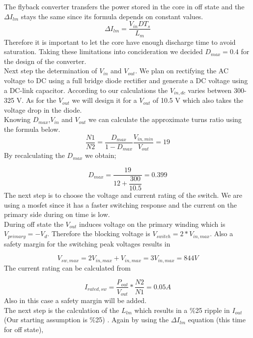 \documentclass[12pt]{article}
\begin{document}
The flyback converter transfers the power stored in the core in off state and the $\Delta I_{lm}$ stays the same since its formula depends on constant values.
\begin{equation*}
    \Delta I_{lm}= \dfrac{V_{in}DT_{s}}{L_{m}}
\end{equation*}
Therefore it is important to let the core have enough discharge time to avoid saturation. Taking these limitations into concideration we decided $D_{max}=0.4$ for the design of the converter.\\
Next step the determination of $V_{in}$ and $V_{out}$. We plan on rectifying the AC voltage to DC using a full bridge diode rectifier and generate a DC voltage using a DC-link capacitor. According to our calculations the $V_{in,dc}$ varies between 300-325 V. As for the $V_{out}$ we will design it for a $V_{out}$ of 10.5 V which also takes the voltage drop in the diode.\\
Knowing $D_{max}$,$V_{in}$ and $V_{out}$ we can calculate the approximate turns ratio using the formula below.
\begin{equation*}
    \dfrac{N1}{N2}=\dfrac{D_{max}}{1-D_{max}}\dfrac{V_{in,min}}{V_{out}}= 19 
\end{equation*}
By recalculating the $D_{max}$ we obtain;

\begin{equation*}
    D_{max}=\dfrac{19}{12+\dfrac{300}{10.5}}=0.399 
\end{equation*}
The next step is to choose the voltage and current rating of the switch. We are using a mosfet since it has a faster switching response and the current on the primary side during on time is low.\\
During off state the $V_{out}$ induces voltage on the primary winding which is $V_{primary}=-V_{d}$.
Therefore the blocking voltage is $V_{switch}=2*V_{in,max}$.
Also a safety margin for the switching peak voltages results in

\begin{equation*}
    V_{sw,max}=2 V_{in,max}+ V_{in,max}=3V_{in,max}=844 V
\end{equation*}
The current rating can be calculated from

\begin{equation*}
    I_{rated,sw}=\dfrac{P_{out}}{V_{out}}*\dfrac{N2}{N1}=0.05A
\end{equation*}
Also in this case a safety margin will be added.\\
The next step is the calculation of the $L_{lm}$ which results in a \%25 ripple in $I_{out}$(Our starting assumption is \%25) 
. Again by using the $\Delta I_{lm}$ equation (this time for off state),
\end{document}
